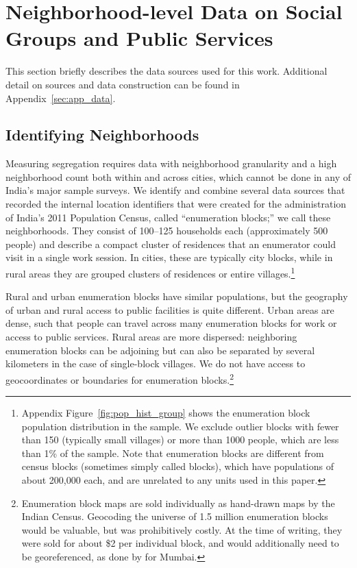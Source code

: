 \documentclass[12pt]{article}
\begin{document}
\section{Neighborhood-level Data on Social Groups and Public Services}
\label{sec:data}

This section briefly describes the data sources used for this work. Additional detail on sources and data construction can be found in Appendix~\ref{sec:app_data}.

\subsection{Identifying Neighborhoods}

Measuring segregation requires data with neighborhood granularity and a high neighborhood count both within and across cities, which cannot be done in any of India's major sample surveys. We identify and combine several data sources that recorded the internal location identifiers that were created for the administration of India's 2011 Population Census, called ``enumeration blocks;'' we call these neighborhoods. They consist of 100--125 households each (approximately 500 people) and describe a compact cluster of residences that an enumerator could visit in a single work session. In cities, these are typically city blocks, while in rural areas they are grouped clusters of residences or entire villages.\footnote{Appendix Figure~\ref{fig:pop_hist_group} shows the enumeration block population distribution in the sample. We exclude outlier blocks with fewer than 150 (typically small villages) or more than 1000 people, which are less than 1\% of the sample. Note that enumeration blocks are different from census blocks (sometimes simply called blocks), which have populations of about 200,000 each, and are unrelated to any units used in this paper.}

Rural and urban enumeration blocks have similar populations, but the geography of urban and rural access to public facilities is quite different. Urban areas are dense, such that people can travel across many enumeration blocks for work or access to public services. Rural areas are more dispersed: neighboring enumeration blocks can be adjoining but can also be separated by several kilometers in the case of single-block villages. We do not have access to geocoordinates or boundaries for enumeration blocks.\footnote{Enumeration block maps are sold individually as hand-drawn maps by the Indian Census. Geocoding the universe of 1.5 million enumeration blocks would be valuable, but was prohibitively costly. At the time of writing, they were sold for about \$2 per individual block, and would additionally need to be georeferenced, as done by \citet{gechter2023} for Mumbai.}
\end{document}
